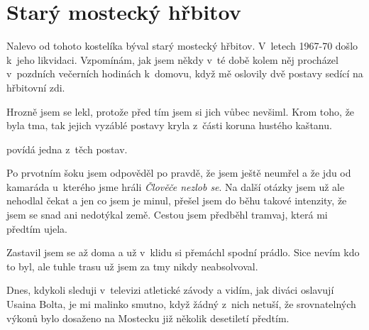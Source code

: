
\chapter{Starý mostecký hřbitov}

Nalevo od tohoto kostelíka býval starý mostecký hřbitov. V~letech 1967-70 došlo
k~jeho likvidaci. Vzpomínám, jak jsem někdy v~té době kolem něj procházel
v~pozdních večerních hodinách k~domovu, když mě oslovily dvě postavy sedící na
hřbitovní zdi.

Hrozně jsem se lekl, protože před tím jsem si jich vůbec nevšiml. Krom toho, že
byla tma, tak jejich vyzáblé postavy kryla z~části koruna hustého kaštanu.

 povídá jedna z~těch
postav. 

Po prvotním šoku jsem odpověděl po pravdě, že jsem ještě neumřel a že jdu od
kamaráda u~kterého jsme hráli {\em Člověče nezlob se}. Na další otázky jsem už
ale nehodlal čekat a jen co jsem je minul, přešel jsem do běhu takové
intenzity, že jsem se snad ani nedotýkal země. Cestou jsem předběhl tramvaj,
která mi předtím ujela.

Zastavil jsem se až doma a už v~klidu si přemáchl spodní prádlo. Sice
nevím kdo to byl, ale tuhle trasu už jsem za tmy nikdy neabsolvoval.

Dnes, kdykoli sleduji v~televizi atletické závody a vidím, jak diváci oslavují
Usaina Bolta, je mi malinko smutno, když žádný z~nich netuší, že srovnatelných
výkonů bylo dosaženo na Mostecku již několik desetiletí předtím.

